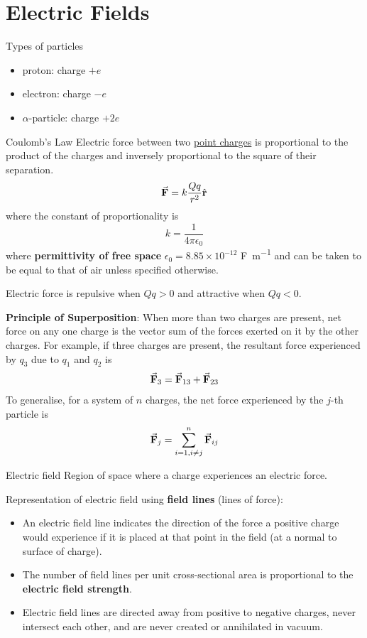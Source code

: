 \section{Electric Fields}
Types of particles
\begin{itemize}
\item proton: charge $+e$
\item electron: charge $-e$
\item $\alpha$-particle: charge $+2e$
\end{itemize}

\begin{defn}{Coulomb’s Law}{}
Electric force between two \underline{point charges} is proportional to the product of the charges and inversely proportional to the square of their separation.
\begin{equation}
\va{F} = k\frac{Qq}{r^2}\hat{\vb{r}}
\end{equation}
where the constant of proportionality is 
\[ k=\frac{1}{4\pi\epsilon_0} \]
where \textbf{permittivity of free space} $\epsilon_0 = 8.85 \times 10^{-12}$ \unit{F.m^{-1}} and can be taken to be equal to that of air unless specified otherwise.
\end{defn}

\begin{remark}
Electric force is repulsive when $Qq>0$ and attractive when $Qq<0$.
\end{remark}

\textbf{Principle of Superposition}: When more than two charges are
present, net force on any one charge is the vector sum of the forces exerted on it by the other charges. For example, if three charges are present, the resultant force experienced by $q_3$ due to $q_1$ and $q_2$ is
\[ \va{F}_3 = \va{F}_{13} + \va{F}_{23} \]
To generalise, for a system of $n$ charges, the net force experienced by the $j$-th particle is
\[ \va{F}_j = \sum_{i=1,i\neq j}^n\va{F}_{ij} \]

\begin{defn}{Electric field}{}
Region of space where a charge experiences an electric force.
\end{defn}

Representation of electric field using \textbf{field lines} (lines of force):
\begin{itemize}
\item An electric field line indicates the direction of the force a positive charge would experience if it is placed at that point in the field (at a normal to surface of charge).
\item The number of field lines per unit cross-sectional area is proportional to the \textbf{electric field strength}.
\item Electric field lines are directed away from positive to negative charges, never intersect each other, and are never created or annihilated in vacuum.
\end{itemize}

